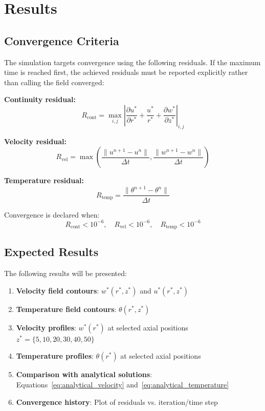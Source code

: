 \documentclass[12pt,a4paper]{article}
\newcommand{\parder}[2]{\frac{\partial #1}{\partial #2}}
\begin{document}
\newpage

\section{Results}

\subsection{Convergence Criteria}

The simulation targets convergence using the following residuals. If the maximum time is reached
first, the achieved residuals must be reported explicitly rather than calling the field converged:

\textbf{Continuity residual:}
\begin{equation}
    R_{\text{cont}} = \max_{i,j}\left|\parder{u^*}{r^*} + \frac{u^*}{r^*} + \parder{w^*}{z^*}\right|_{i,j}
\end{equation}

\textbf{Velocity residual:}
\begin{equation}
    R_{\text{vel}} = \max\left(\frac{\|u^{n+1} - u^n\|}{\Delta t}, \frac{\|w^{n+1} - w^n\|}{\Delta t}\right)
\end{equation}

\textbf{Temperature residual:}
\begin{equation}
    R_{\text{temp}} = \frac{\|\theta^{n+1} - \theta^n\|}{\Delta t}
\end{equation}

Convergence is declared when:
\begin{equation}
    R_{\text{cont}} < 10^{-6}, \quad R_{\text{vel}} < 10^{-6}, \quad R_{\text{temp}} < 10^{-6}
\end{equation}

\subsection{Expected Results}

The following results will be presented:

\begin{enumerate}
    \item \textbf{Velocity field contours}: $w^*(r^*, z^*)$ and $u^*(r^*, z^*)$
    \item \textbf{Temperature field contours}: $\theta(r^*, z^*)$
    \item \textbf{Velocity profiles}: $w^*(r^*)$ at selected axial positions $z^* = \{5, 10, 20, 30, 40, 50\}$
    \item \textbf{Temperature profiles}: $\theta(r^*)$ at selected axial positions
    \item \textbf{Comparison with analytical solutions}: Equations~\eqref{eq:analytical_velocity} and~\eqref{eq:analytical_temperature}
    \item \textbf{Convergence history}: Plot of residuals vs. iteration/time step
\end{enumerate}
\end{document}
